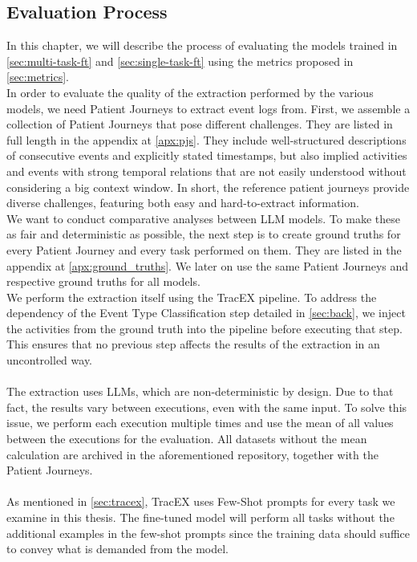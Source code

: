 \subsection{Evaluation Process}\label{sec:eval_process}
In this chapter, we will describe the process of evaluating the models trained in \autoref{sec:multi-task-ft} and \autoref{sec:single-task-ft} using the metrics proposed in \autoref{sec:metrics}.\\
In order to evaluate the quality of the extraction performed by the various models, we need Patient Journeys to extract event logs from. First, we assemble a collection of Patient Journeys that pose different challenges. They are listed in full length in the appendix at \ref{apx:pjs}. They include well-structured descriptions of consecutive events and explicitly stated timestamps, but also implied activities and events with strong temporal relations that are not easily understood without considering a big context window. In short, the reference patient journeys provide diverse challenges, featuring both easy and hard-to-extract information.\\
We want to conduct comparative analyses between LLM models. To make these as fair and deterministic as possible, the next step is to create ground truths for every Patient Journey and every task performed on them. They are listed in the appendix at \ref{apx:ground_truths}. We later on use the same Patient Journeys and respective ground truths for all models.\\
We perform the extraction itself using the TracEX pipeline. To address the dependency of the Event Type Classification step detailed in \autoref{sec:back}, we inject the activities from the ground truth into the pipeline before executing that step. This ensures that no previous step affects the results of the extraction in an uncontrolled way.\\\\
The extraction uses LLMs, which are non-deterministic by design. Due to that fact, the results vary between executions, even with the same input. To solve this issue, we perform each execution multiple times and use the mean of all values between the executions for the evaluation. All datasets without the mean calculation are archived in the aforementioned repository, together with the Patient Journeys.\\\\
As mentioned in \autoref{sec:tracex}, TracEX uses Few-Shot prompts for every task we examine in this thesis. The fine-tuned model will perform all tasks without the additional examples in the few-shot prompts since the training data should suffice to convey what is demanded from the model.\\

